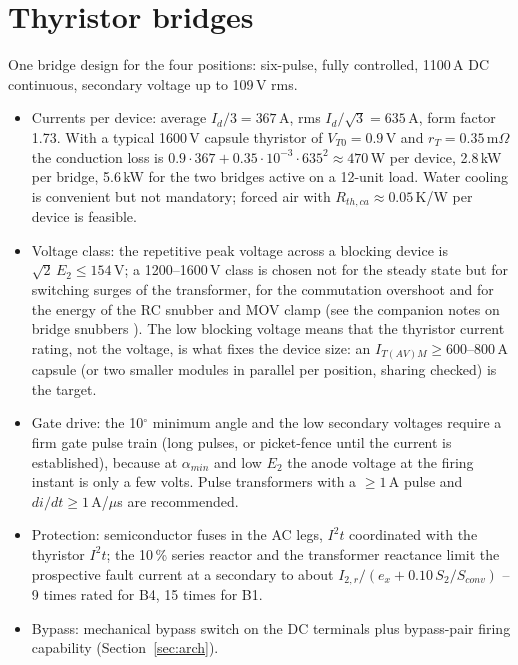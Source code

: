 \documentclass[11pt,a4paper]{article}
\newcommand{\Id}{I_d}
\newcommand{\ex}{e_x}
\newcommand{\Ell}{E_{2}}
\begin{document}
\section{Thyristor bridges}
\label{sec:bridges}

One bridge design for the four positions: six-pulse, fully controlled, 1100\,A DC continuous, secondary voltage up to 109\,V rms.

\begin{itemize}
\item Currents per device: average $\Id/3 = 367$\,A, rms $\Id/\sqrt3 = 635$\,A, form factor 1.73. With a typical 1600\,V capsule thyristor of $V_{T0} = 0.9$\,V and $r_T = 0.35$\,m$\Omega$ the conduction loss is $0.9\cdot367 + 0.35\cdot10^{-3}\cdot635^2 \approx 470$\,W per device, 2.8\,kW per bridge, 5.6\,kW for the two bridges active on a 12-unit load. Water cooling is convenient but not mandatory; forced air with $R_{th,ca} \approx 0.05$\,K/W per device is feasible.
\item Voltage class: the repetitive peak voltage across a blocking device is $\sqrt2\,\Ell \le 154$\,V; a 1200--1600\,V class is chosen not for the steady state but for switching surges of the transformer, for the commutation overshoot and for the energy of the RC snubber and MOV clamp (see the companion notes on bridge snubbers \cite{snubber}). The low blocking voltage means that the thyristor current rating, not the voltage, is what fixes the device size: an $I_{T(AV)M} \ge 600$--800\,A capsule (or two smaller modules in parallel per position, sharing checked) is the target.
\item Gate drive: the 10$^\circ$ minimum angle and the low secondary voltages require a firm gate pulse train (long pulses, or picket-fence until the current is established), because at $\alpha_{min}$ and low $\Ell$ the anode voltage at the firing instant is only a few volts. Pulse transformers with a $\ge 1$\,A pulse and $di/dt \ge 1$\,A/$\mu$s are recommended.
\item Protection: semiconductor fuses in the AC legs, $I^2t$ coordinated with the thyristor $I^2t$; the 10\,\% series reactor and the transformer reactance limit the prospective fault current at a secondary to about $I_{2,r}/(\ex + 0.10\,S_2/S_{conv})$ -- 9 times rated for B4, 15 times for B1.
\item Bypass: mechanical bypass switch on the DC terminals plus bypass-pair firing capability (Section~\ref{sec:arch}).
\end{itemize}
\end{document}
